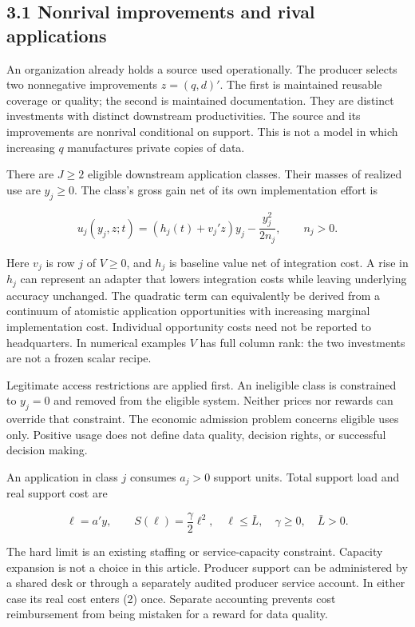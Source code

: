 \documentclass[
  11pt,
]{article}
\begin{document}
\subsection{3.1 Nonrival improvements and rival
applications}\label{nonrival-improvements-and-rival-applications}

An organization already holds a source used operationally. The producer
selects two nonnegative improvements \(z=(q,d)'\). The first is
maintained reusable coverage or quality; the second is maintained
documentation. They are distinct investments with distinct downstream
productivities. The source and its improvements are nonrival conditional
on support. This is not a model in which increasing \(q\) manufactures
private copies of data.

There are \(J\geq2\) eligible downstream application classes. Their
masses of realized use are \(y_j\geq0\). The class's gross gain net of
its own implementation effort is

\[u_j(y_j,z;t)=(h_j(t)+v_j'z)y_j-\frac{y_j^2}{2n_j},\qquad n_j>0. \tag{1}\]

Here \(v_j\) is row \(j\) of \(V\geq0\), and \(h_j\) is baseline value
net of integration cost. A rise in \(h_j\) can represent an adapter that
lowers integration costs while leaving underlying accuracy unchanged.
The quadratic term can equivalently be derived from a continuum of
atomistic application opportunities with increasing marginal
implementation cost. Individual opportunity costs need not be reported
to headquarters. In numerical examples \(V\) has full column rank: the
two investments are not a frozen scalar recipe.

Legitimate access restrictions are applied first. An ineligible class is
constrained to \(y_j=0\) and removed from the eligible system. Neither
prices nor rewards can override that constraint. The economic admission
problem concerns eligible uses only. Positive usage does not define data
quality, decision rights, or successful decision making.

An application in class \(j\) consumes \(a_j>0\) support units. Total
support load and real support cost are

\[\ell=a'y,\qquad S(\ell)=\frac{\gamma}{2}\ell^2,\quad
\ell\leq\bar L,\quad \gamma\geq0,\quad \bar L>0. \tag{2}\]

The hard limit is an existing staffing or service-capacity constraint.
Capacity expansion is not a choice in this article. Producer support can
be administered by a shared desk or through a separately audited
producer service account. In either case its real cost enters (2) once.
Separate accounting prevents cost reimbursement from being mistaken for
a reward for data quality.
\end{document}
